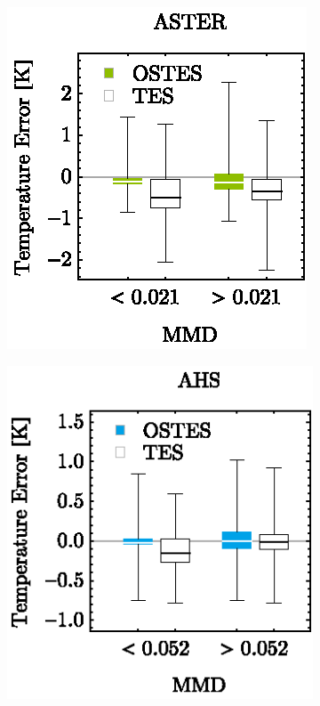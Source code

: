 \begin{figure}[!b]
	\centering
	\vspace{1em}
	\begin{subfigure}[t]{.3\linewidth}
		\centering
		\includegraphics[scale=1]{pics/Chapter_04/Simulated_data_ASTER.eps}
		\caption{}
	\end{subfigure}
	\hspace{1em}
	\begin{subfigure}[t]{.3\linewidth}
		\centering
		\includegraphics[scale=1]{pics/Chapter_04/Simulated_data_AHS.eps}
		\caption{}
	\end{subfigure}
	\hspace{1em}
	\begin{subfigure}[t]{.3\linewidth}

\end{subfigure}
\end{figure}
